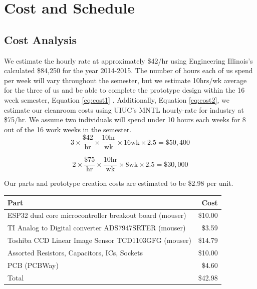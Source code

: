\documentclass{article}
\begin{document}
\section{Cost and Schedule}

\subsection{Cost Analysis}

We estimate the hourly rate at approximately \$42/hr using Engineering Illinois's calculated \$84,250 for the year 2014-2015. 
The number of hours each of us spend per week will vary throughout the semester, but we estimate 10hrs/wk average for the three of us and be able to complete the prototype design within the 16 week semester, Equation \ref{eq:cost1}
. Additionally, Equation \ref{eq:cost2}, we estimate our cleanroom costs using UIUC's MNTL hourly-rate for industry at \$75/hr. We assume two individuals will spend under 10 hours each weeks for 8 out of the 16 work weeks in the semester. 
\begin{equation}\label{eq:cost1}
    3 \times \frac{\$ 42}{\text{hr}}\times \frac{10 \text{hr}}{\text{wk}} \times  16 \text{wk}  \times  2.5 = \$50,400 
\end{equation}

\begin{equation}\label{eq:cost2}
     2 \times \frac{\$ 75}{\text{hr}}\times \frac{10\text{hr}}{\text{wk}} \times  8 \text{wk}  \times  2.5 = \$30,000
\end{equation}

Our parts and prototype creation costs are estimated to be \$2.98 per unit.

\begin{center}
\begin{tabular}{ |l|r| } 
 \hline
 Part & Cost \\ 
 \hline
 ESP32 dual core microcontroller breakout board (mouser) & \$10.00  \\ 
 TI Analog to Digital converter ADS7947SRTER (mouser) & \$3.59  \\ 
 Toshiba CCD Linear Image Sensor TCD1103GFG (mouser) & \$14.79  \\ 
 Assorted Resistors, Capacitors, ICs, Sockets & \$10.00  \\
 PCB (PCBWay) & \$4.60 \\
 \hline
 Total & \$42.98 \\
 \hline
\end{tabular}
\end{center}
\end{document}
